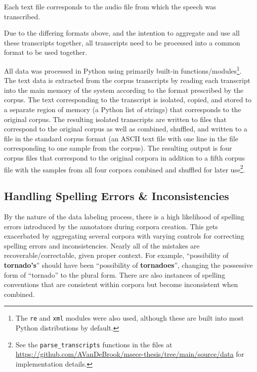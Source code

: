 \documentclass[12pt]{article}
\begin{document}
\noindent
Each text file corresponds to the audio file from which the speech was transcribed.

Due to the differing formats above, and the intention to aggregate and use all these transcripts together, all transcripts need to be processed into
a common format to be used together.

All data was processed in Python using primarily built-in functions/modules\footnote{The \lstinline|re| and \lstinline|xml| modules were also used,
    although these are built into most Python distributions by default.}. The text data is extracted from the corpus transcripts by reading each
transcript into the main memory of the system according to the format prescribed by the corpus. The text corresponding to the transcript is isolated,
copied, and stored to a separate region of memory (a Python list of strings) that corresponds to the original corpus. The resulting isolated
transcripts are written to files that correspond to the original corpus as well as combined, shuffled, and written to a file in the standard corpus
format (an ASCII text file with one line in the file corresponding to one sample from the corpus). The resulting output is four corpus files that
correspond to the original corpora in addition to a fifth corpus file with the samples from all four corpora combined and shuffled for later
use\footnote{See the \lstinline|parse_transcripts| functions in the files at \url{https://github.com/AVanDeBrook/msece-thesis/tree/main/source/data}
    for implementation details.}.

\subsection{Handling Spelling Errors \& Inconsistencies}\label{sec:spelling_errors}
By the nature of the data labeling process, there is a high likelihood of spelling errors introduced by the annotators during corpora creation. This
gets exacerbated by aggregating several corpora with varying controls for correcting spelling errors and inconsistencies. Nearly all of the mistakes
are recoverable/correctable, given proper context. For example, ``possibility of \textbf{tornado's}'' should have been ``possibility of
\textbf{tornadoes}'', changing the possessive form of ``tornado'' to the plural form. There are also instances of spelling conventions that are
consistent within corpora but become inconsistent when combined.
\end{document}
